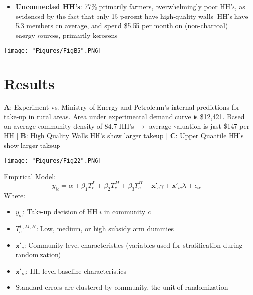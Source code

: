 \documentclass[compress]{beamer}
\begin{document}
\begin{frame}
\begin{itemize}
\item \textbf{Unconnected HH's}: 77\% primarily farmers, overwhelmingly poor HH's, as evidenced by the fact that only 15 percent have high-quality walls. HH's have 5.3 members on average, and spend \$5.55 per month on (non-charcoal) energy sources, primarily kerosene
\end{itemize}
\begin{adjustbox}{center}
\texttt{[image: "Figures/FigB6".PNG]} 
\end{adjustbox}
\end{frame}



\section{Results}

\begin{frame}
\scriptsize
\textbf{A}: Experiment vs. Ministry of Energy and Petroleum's internal predictions for take-up in
rural areas. Area under experimental demand curve is \$12,421. Based on average community density of 84.7 HH's $\to$ average valuation is just \$147 per HH $|$ \textbf{B}: High Quality Walls HH's show larger takeup $|$ \textbf{C}: Upper Quantile HH's show larger takeup  \vspace{2mm}

\begin{adjustbox}{center}
\texttt{[image: "Figures/Fig22".PNG]} 
\end{adjustbox}
\end{frame}

\begin{frame}
Empirical Model:
\begin{equation}
y_{ic}=\alpha + \beta_1T_c^L+\beta_2T_c^M+\beta_3T_c^H+\textbf{x}'_c\gamma +\textbf{x}'_{ic}\lambda+\epsilon_{ic}
\end{equation}
Where: 
\begin{itemize}
\item $y_{ic}$: Take-up decision of HH $i$ in community $c$
\item $T_c^{L,M,H}$: Low, medium, or high subsidy arm dummies
\item $\textbf{x}'_c$: Community-level characteristics (variables used for
stratification during randomization)
\item $\textbf{x}'_{ic}$: HH-level baseline characteristics 
\item Standard errors are clustered by community, the unit of randomization
\end{itemize}
\end{frame}
\end{document}
